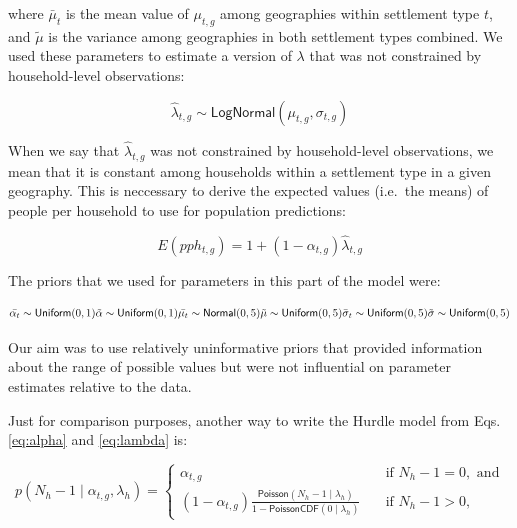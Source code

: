 \documentclass[]{book}
\begin{document}
where \(\bar{\mu}_t\) is the mean value of \(\mu_{t,g}\) among
geographies within settlement type \(t\), and \(\tilde{\mu}\) is the
variance among geographies in both settlement types combined. We used
these parameters to estimate a version of \(\lambda\) that was not
constrained by household-level observations:

\begin{equation}
\hat{\lambda}_{t,g} \sim \textsf{LogNormal}(\mu_{t,g}, \sigma_{t,g})
\label{eq:lambdahat}
\end{equation}

When we say that \(\hat{\lambda}_{t,g}\) was not constrained by
household-level observations, we mean that it is constant among
households within a settlement type in a given geography. This is
neccessary to derive the expected values (i.e.~the means) of people per
household to use for population predictions:

\begin{equation}
E(pph_{t,g}) = 1 + (1 - \alpha_{t,g}) \hat{\lambda}_{t,g}
\end{equation}

The priors that we used for parameters in this part of the model were:

\begin{equation}
\bar{\alpha_t} \sim \textsf{Uniform}(0, 1) \\ 
\tilde{\alpha} \sim \textsf{Uniform}(0, 1) \\
\bar{\mu_t} \sim \textsf{Normal}(0, 5) \\ 
\tilde{\mu} \sim \textsf{Uniform}(0, 5) \\ 
\bar{\sigma}_t \sim \textsf{Uniform}(0, 5) \\
\tilde{\sigma} \sim \textsf{Uniform}(0, 5) \\
\end{equation}

Our aim was to use relatively uninformative priors that provided
information about the range of possible values but were not influential
on parameter estimates relative to the data.

Just for comparison purposes, another way to write the Hurdle model from
Eqs. \eqref{eq:alpha} and \eqref{eq:lambda} is:

\begin{equation}
p(N_h - 1 \mid \alpha_{t,g}, \lambda_h)
=
\begin{cases}
\alpha_{t,g} &\quad \text{if } N_h - 1 = 0, \text{ and} \\
(1 - \alpha_{t,g})
   \frac{\displaystyle \textsf{Poisson}(N_h - 1 \mid \lambda_h)}
        {\displaystyle  1 - \textsf{PoissonCDF}(0 \mid \lambda_h)}
&\quad\text{if } N_h - 1 > 0,
\end{cases}
\end{equation}
\end{document}
